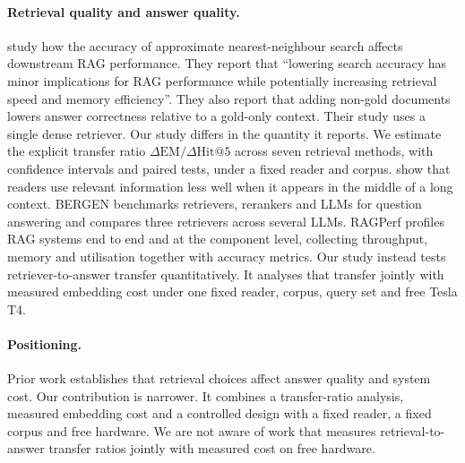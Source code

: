 \paragraph{Retrieval quality and answer quality.}
\citet{leto2024toward} study how the accuracy of approximate nearest-neighbour search affects downstream RAG performance.
They report that ``lowering search accuracy has minor implications for RAG performance while potentially increasing retrieval speed and memory efficiency''.
They also report that adding non-gold documents lowers answer correctness relative to a gold-only context.
Their study uses a single dense retriever.
Our study differs in the quantity it reports.
We estimate the explicit transfer ratio $\Delta\mathrm{EM}/\Delta\mathrm{Hit@5}$ across seven retrieval methods, with confidence intervals and paired tests, under a fixed reader and corpus.
\citet{liu2024lost} show that readers use relevant information less well when it appears in the middle of a long context.
BERGEN \citep{rau2024bergen} benchmarks retrievers, rerankers and LLMs for question answering and compares three retrievers across several LLMs.
RAGPerf \citep{li2026ragperf} profiles RAG systems end to end and at the component level, collecting throughput, memory and utilisation together with accuracy metrics.
Our study instead tests retriever-to-answer transfer quantitatively.
It analyses that transfer jointly with measured embedding cost under one fixed reader, corpus, query set and free Tesla T4.

\paragraph{Positioning.}
Prior work establishes that retrieval choices affect answer quality and system cost.
Our contribution is narrower.
It combines a transfer-ratio analysis, measured embedding cost and a controlled design with a fixed reader, a fixed corpus and free hardware.
We are not aware of work that measures retrieval-to-answer transfer ratios jointly with measured cost on free hardware.
